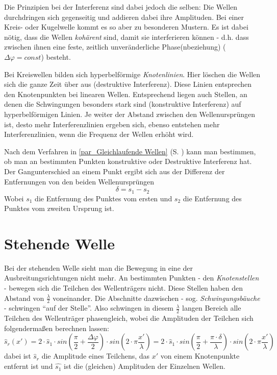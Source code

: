 Die Prinzipien bei der Interferenz sind dabei jedoch die selben: Die Wellen durchdringen sich gegenseitig und addieren dabei ihre Amplituden. Bei einer Kreis- oder Kugelwelle kommt es so aber zu besonderen Mustern. Es ist dabei nötig, dass die Wellen \emph{kohärent} sind, damit sie interferieren können - d.h. dass zwischen ihnen eine feste, zeitlich unveränderliche Phase(nbeziehung) (\(\Delta\varphi = const\)) besteht.

Bei Kreiswellen bilden sich hyperbelförmige \emph{Knotenlinien}. Hier löschen die Wellen sich die ganze Zeit über aus (destruktive Interferenz). Diese Linien entsprechen den Knotenpunkten bei linearen Wellen. Entsprechend liegen auch Stellen, an denen die Schwingungen besonders stark sind (konstruktive Interferenz) auf hyperbelförmigen Linien. Je weiter der Abstand zwischen den Wellenursprüngen ist, desto mehr Interferenzlinien ergeben sich, ebenso entstehen mehr Interferenzlinien, wenn die Frequenz der Wellen erhöht wird. 

Nach dem Verfahren in \ref{par_Gleichlaufende Wellen} (S. \pageref{par_Gleichlaufende Wellen}) kann man bestimmen, ob man an bestimmten Punkten konstruktive oder Destruktive Interferenz hat. Der Gangunterschied an einem Punkt ergibt sich aus der Differenz der Entfernungen von den beiden Wellenursprüngen
\begin{equation}
 \delta = s_1 - s_2
\end{equation}
Wobei \(s_1\) die Entfernung des Punktes vom ersten und \(s_2\) die Entfernung des Punktes vom zweiten Ursprung ist.





		\chapter{Stehende Welle}

Bei der stehenden Welle sieht man die Bewegung in eine der Ausbreitungsrichtungen nicht mehr. An bestimmten Punkten - den \emph{Knotenstellen} - bewegen sich die Teilchen des Wellenträgers nicht. Diese Stellen haben den Abstand von \(\frac{\lambda}{2}\) voneinander. Die Abschnitte dazwischen - sog. \emph{Schwingungsbäuche} - schwingen ``auf der Stelle''. Also schwingen in diesem \(\frac{\lambda}{2}\) langen Bereich alle Teilchen des Wellenträger phasengleich, wobei die Amplituden der Teilchen sich folgendermaßen berechnen lassen:
\begin{equation}
 	\hat{s}_r(x') = 2 \cdot \hat{s}_1 \cdot sin \left ( \frac{\pi}{2} + \frac{\Delta \varphi}{2} \right ) \cdot sin(2 \cdot \pi \frac{x'}{\lambda}) = 2 \cdot \hat{s}_1 \cdot sin \left ( \frac{\pi}{2} + \frac{\pi \cdot \delta}{\lambda} \right ) \cdot sin(2 \cdot \pi \frac{x'}{\lambda})
\end{equation}
dabei ist \(\hat{s}_r\) die Amplitude eines Teilchens, das \(x'\) von einem Knotenpunkte entfernt ist und \(\hat{s_1}\) ist die (gleichen) Amplituden der Einzelnen Wellen.


